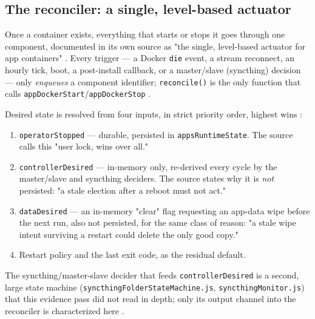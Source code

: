 \subsection{The reconciler: a single, level-based actuator}
\label{sec:fluxos-reconciler}

Once a container exists, everything that starts or stops it goes through one component,
documented in its own source as "the single, level-based actuator for app containers"
. Every trigger — a Docker
\texttt{die} event, a stream reconnect, an hourly tick, boot, a post-install callback, or a
master/slave (syncthing) decision — only \emph{enqueues} a component identifier;
\texttt{reconcile()} is the only function that calls \texttt{appDockerStart}\slash\texttt{appDockerStop}
.

Desired state is resolved from four inputs, in strict priority order, highest wins
:
\begin{enumerate}
\item \texttt{operator\allowbreak{}Stopped} — durable, persisted in \texttt{apps\allowbreak{}Runtime\allowbreak{}State}. The source calls
  this "user lock, wins over all."
\item \texttt{controller\allowbreak{}Desired} — in-memory only, re-derived every cycle by the master/slave and
  syncthing deciders. The source states why it is \emph{not} persisted: "a stale election after a
  reboot must not act."
\item \texttt{dataDesired} — an in-memory "clear" flag requesting an app-data wipe before the next
  run, also not persisted, for the same class of reason: "a stale wipe intent surviving a restart
  could delete the only good copy."
\item Restart policy and the last exit code, as the residual default.
\end{enumerate}
The syncthing/master-slave decider that feeds \texttt{controller\allowbreak{}Desired} is a second, large state
machine (\texttt{syncthingFolderStateMachine.\allowbreak{}js}, \texttt{syncthing\allowbreak{}Monitor.\allowbreak{}js}) that this evidence
pass did not read in depth; only its output channel into the reconciler is characterized here
\srcinferred.

